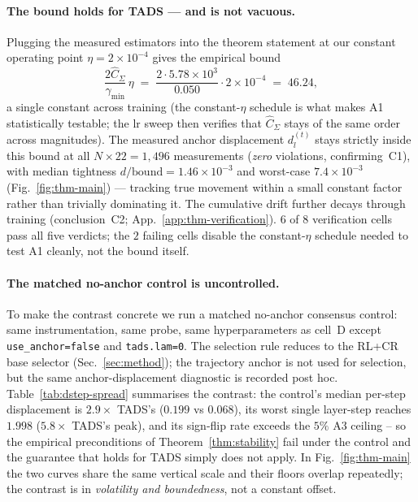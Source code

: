 \paragraph{The bound holds for \textsc{TADS} --- and is not vacuous.}
Plugging the measured estimators into the theorem statement at our
constant operating point $\eta=2\times 10^{-4}$ gives the empirical
bound
\[
\frac{2\hat{C}_\Sigma}{\gamma_{\min}}\,\eta
\;=\;
\frac{2\cdot 5.78\times 10^{3}}{0.050}\cdot 2\times 10^{-4}
\;=\;46.24,
\]
a single constant across training (the constant-$\eta$ schedule is
what makes A1 statistically testable; the lr sweep then verifies
that $\hat{C}_\Sigma$ stays of the same order across magnitudes).
The measured anchor displacement $d_l^{(t)}$ stays strictly inside
this bound at all $N\times 22=1{,}496$ measurements (\emph{zero}
violations, confirming~C1), with median tightness
$d/\mathrm{bound}=1.46\times 10^{-3}$ and worst-case
$7.4\times 10^{-3}$ (Fig.~\ref{fig:thm-main}) --- tracking true
movement within a small constant factor rather than trivially
dominating it. The cumulative drift further decays through training
(conclusion~C2; App.~\ref{app:thm-verification}). $6$ of $8$
verification cells pass all five verdicts; the $2$ failing cells
disable the constant-$\eta$ schedule needed to test A1 cleanly,
not the bound itself.

\paragraph{The matched no-anchor control is uncontrolled.}
To make the contrast concrete we run a matched no-anchor consensus
control: same instrumentation, same probe, same hyperparameters as
cell~D except \texttt{use\_anchor=false} and \texttt{tads.lam=0}.
The selection rule reduces to the RL+CR base selector
(Sec.~\ref{sec:method}); the trajectory anchor is not used for
selection, but the same anchor-displacement diagnostic is recorded
post hoc. Table~\ref{tab:dstep-spread} summarises the contrast:
the control's median per-step displacement is $2.9\times$
\textsc{TADS}'s ($0.199$ vs $0.068$), its worst single layer-step
reaches $1.998$ ($5.8\times$ \textsc{TADS}'s peak), and its sign-flip
rate exceeds the $5\%$ A3 ceiling -- so the empirical preconditions
of Theorem~\ref{thm:stability} fail under the control and the
guarantee that holds for \textsc{TADS} simply does not apply. In
Fig.~\ref{fig:thm-main} the two curves share the same vertical
scale and their floors overlap repeatedly; the contrast is in
\emph{volatility and boundedness}, not a constant offset.

